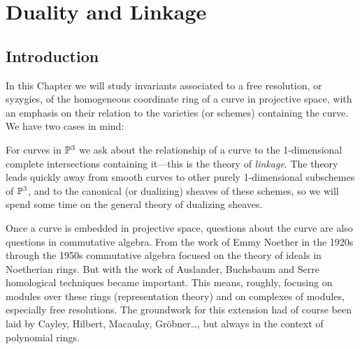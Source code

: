               

\chapter{Duality and Linkage}
\label{DualityChapter}


%
%
%
%
%
%
%
%
\def\length{{\rm length}}
\section{Introduction} 
In this Chapter we will study  invariants associated to a free resolution, or syzygies, of the homogeneous coordinate ring of a curve in projective space, with an emphasis on their relation to the varieties (or schemes) containing the curve. We have two cases in mind:

For curves in ${\mathbb P}^{3}$ we ask about the relationship of a curve to the 1-dimensional complete intersections containing it---this is the theory of \emph{linkage}. The theory leads quickly away from smooth curves to other purely 1-dimensional subschemes of ${\mathbb P}^{3}$, and to the canonical (or dualizing) sheaves of these schemes, so we will spend some time on the general theory of dualizing sheaves.

Once a curve is embedded in projective space, questions about the curve are also questions in commutative algebra. From the work of Emmy Noether in the 1920s through the 1950s commutative algebra focused on the theory of ideals in Noetherian rings. But with the work of Auslander, Buchsbaum and Serre homological techniques became important. This means, roughly, focusing on modules over these rings (representation theory) and on complexes of modules, especially free resolutions. The groundwork for this extension had of course been laid by Cayley, Hilbert, Macaulay, Gr\"obner\dots, but always in the context of polynomial rings. 

